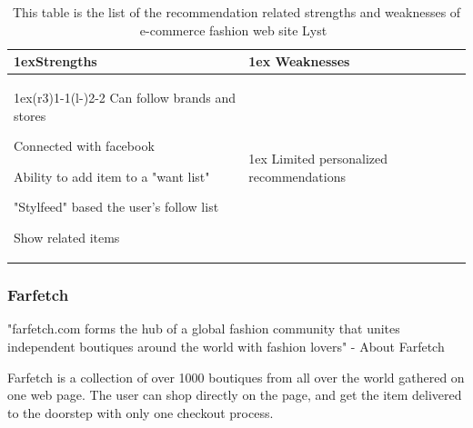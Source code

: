     \begin{table}[H]
    	\centering
        \begin{tabularx}{\linewidth}{>{\parskip1ex}X@{\kern4\tabcolsep}>{\parskip1ex}X}
        \toprule
        	\hfil\bfseries Strengths
            &
            \hfil\bfseries Weaknesses
            \\\cmidrule(r{3\tabcolsep}){1-1}\cmidrule(l{-\tabcolsep}){2-2}
                    Can follow brands and stores \par
                    Connected with facebook \par
                    Ability to add item to a "want list" \par
                    "Stylfeed" based the user's follow list \par
                    Show related items \par
                    &
                    Limited personalized recommendations \par
                    \\\bottomrule
                \end{tabularx}
        \caption[Recommendation related strengths and weaknesses of Lyst~\cite{lyst}]{This table is the list of the recommendation related strengths and weaknesses of e-commerce fashion web site Lyst~\cite{lyst}}
        \label{table:ecommenreceLyst}
    \end{table}

\subsubsection{Farfetch} %
\label{par:farfetch}
    "farfetch.com forms the hub of a global fashion community that unites independent boutiques around the world with fashion lovers" - About Farfetch~\cite{Farfetch}

    Farfetch is a collection of over 1000 boutiques from all over the world gathered on one web page.
    The user can shop directly on the page, and get the item delivered to the doorstep with only one checkout process.

